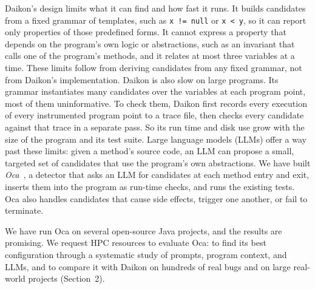 \documentclass{article}
\begin{document}
Daikon's design limits what it can find and how fast it runs.
It builds candidates from a fixed grammar of templates, such as \texttt{x != null} or \texttt{x < y}, so it can report only properties of those predefined forms.
It cannot express a property that depends on the program's own logic or abstractions, such as an invariant that calls one of the program's methods, and it relates at most three variables at a time.
These limits follow from deriving candidates from any fixed grammar, not from Daikon's implementation.
Daikon is also slow on large programs.
Its grammar instantiates many candidates over the variables at each program point, most of them uninformative.
To check them, Daikon first records every execution of every instrumented program point to a trace file, then checks every candidate against that trace in a separate pass.
So its run time and disk use grow with the size of the program and its test suite.
Large language models (LLMs) offer a way past these limits: given a method's source code, an LLM can propose a small, targeted set of candidates that use the program's own abstractions.
We have built \emph{Oca}~\cite{Oca}, a detector that asks an LLM for candidates at each method entry and exit, inserts them into the program as run-time checks, and runs the existing tests.
Oca also handles candidates that cause side effects, trigger one another, or fail to terminate.

We have run Oca on several open-source Java projects, and the results are promising.
We request HPC resources to evaluate Oca: to find its best configuration through a systematic study of prompts, program context, and LLMs, and to compare it with Daikon on hundreds of real bugs and on large real-world projects (Section~2).
\end{document}
